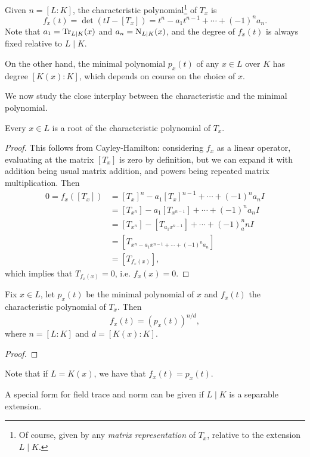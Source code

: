 Given $n=[L : K]$, the characteristic polynomial\footnote{Of course, given by any \emph{matrix representation} of $T_x$, relative to the extension $L\mid K$.} of $T_x$ is
\[
	f_x(t) = \det(tI - [T_x]) = t^n - a_1t^{n-1} + \cdots + (-1)^na_n.
\]
Note that $a_1=\operatorname{Tr}_{L\mid K}(x)$ and $a_n=\operatorname{N}_{L\mid K}(x)$, and the degree of $f_x(t)$ is always fixed relative to $L\mid K$.

On the other hand, the minimal polynomial $p_x(t)$ of any $x\in L$ over $K$ has degree $[K(x) : K]$, which depends on course on the choice of $x$.



We now study the close interplay between the characteristic and the minimal polynomial.

\begin{proposition}
	Every $x \in L$ is a root of the characteristic polynomial of $T_x$.
\end{proposition}
\begin{proof}
	This follows from Cayley-Hamilton: considering $f_x$ as a linear operator, evaluating at the matrix $[T_x]$ is zero by definition, but we can expand it with addition being usual matrix addition, and powers being repeated matrix multiplication. Then
	\begin{align*}
		0 = f_x([T_x]) &= [T_x]^n - a_1[T_x]^{n-1} + \cdots + (-1)^na_n I\\
			&= [T_{x^n}] - a_1[T_{x^{n-1}}] + \cdots + (-1)^na_n I\\
			&= [T_{x^n}] - [T_{a_1x^{n-1}}] + \cdots + (-1)^n_an I\\
			&= [T_{x^n-a_1x^{n-1} + \cdots + (-1)^na_n}]\\
			&= [T_{f_x(x)}],
	\end{align*}
	which implies that $T_{f_x(x)}=0$, i.e. $f_x(x)=0$.
\end{proof}

\begin{proposition}
	Fix $x\in L$, let $p_x(t)$ be the minimal polynomial of $x$ and $f_x(t)$ the characteristic polynomial of $T_x$. Then
	\[
		f_x(t) = (p_x(t))^{n/d},
	\]
	where $n=[L:K]$ and $d=[K(x):K]$.
\end{proposition}
\begin{proof}
\end{proof}

Note that if $L=K(x)$, we have that $f_x(t)=p_x(t)$.


A special form for field trace and norm can be given if $L\mid K$ is a separable extension.

